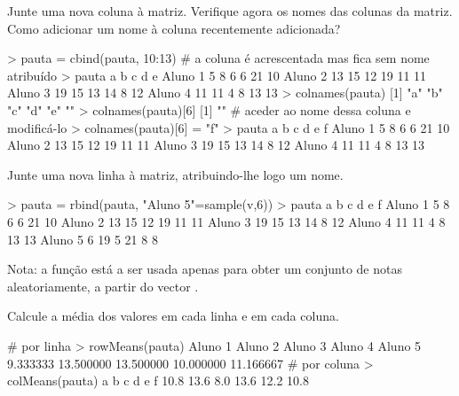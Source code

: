 \documentclass{exam}
\begin{document}
\begin{questions}
\question Junte uma nova coluna à matriz. Verifique agora os nomes das colunas da matriz. Como adicionar um nome à coluna recentemente adicionada?

\begin{solution}
	\begin{rcode}
		> pauta = cbind(pauta, 10:13)
		# a coluna é acrescentada mas fica sem nome atribuído
		> pauta
		         a  b  c  d  e   
		Aluno 1  5  8  6  6 21 10
		Aluno 2 13 15 12 19 11 11
		Aluno 3 19 15 13 14  8 12
		Aluno 4 11 11  4  8 13 13
		> colnames(pauta)
		[1] "a" "b" "c" "d" "e" "" 
		> colnames(pauta)[6]
		[1] ""
		# aceder ao nome dessa coluna e modificá-lo
		> colnames(pauta)[6] = "f"
		> pauta
		         a  b  c  d  e  f
		Aluno 1  5  8  6  6 21 10
		Aluno 2 13 15 12 19 11 11
		Aluno 3 19 15 13 14  8 12
		Aluno 4 11 11  4  8 13 13
	\end{rcode}
\end{solution}

\question Junte uma nova linha à matriz, atribuindo-lhe logo um nome.
\begin{solution}
	\begin{rcode}
		> pauta = rbind(pauta, "Aluno 5"=sample(v,6))
		> pauta
		         a  b  c  d  e  f
		Aluno 1  5  8  6  6 21 10
		Aluno 2 13 15 12 19 11 11
		Aluno 3 19 15 13 14  8 12
		Aluno 4 11 11  4  8 13 13
		Aluno 5  6 19  5 21  8  8
	\end{rcode}
	Nota: a função  está a ser usada apenas para obter um conjunto de notas aleatoriamente, a partir do vector .
\end{solution}

\question Calcule a média dos valores em cada linha e em cada coluna.
\begin{solution}
	\begin{rcode}
		# por linha
		> rowMeans(pauta)
		  Aluno 1   Aluno 2   Aluno 3   Aluno 4   Aluno 5 
		 9.333333 13.500000 13.500000 10.000000 11.166667 
		# por coluna
		> colMeans(pauta)
		   a    b    c    d    e    f 
		10.8 13.6  8.0 13.6 12.2 10.8 
	\end{rcode}
\end{solution}



\end{questions}
\end{document}
